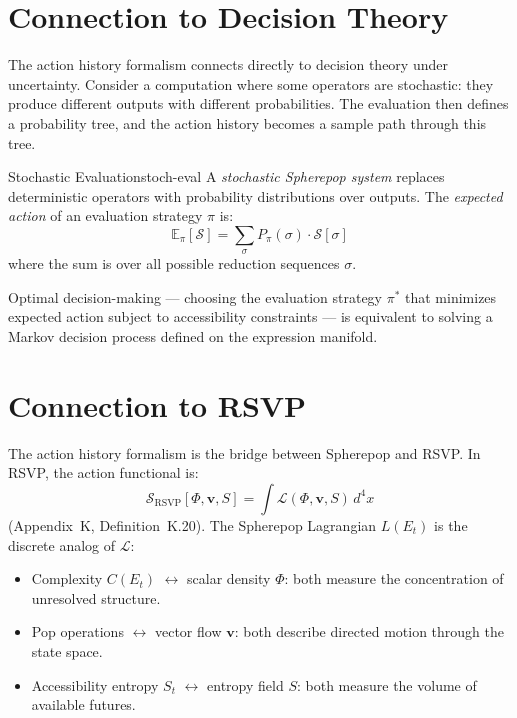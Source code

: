 \section{Connection to Decision Theory}

The action history formalism connects directly to decision theory under
uncertainty. Consider a computation where some operators are stochastic:
they produce different outputs with different probabilities. The evaluation
then defines a probability tree, and the action history becomes a sample
path through this tree.

\begin{definition}{Stochastic Evaluation}{stoch-eval}
  A \emph{stochastic Spherepop system} replaces deterministic operators
  with probability distributions over outputs. The \emph{expected action}
  of an evaluation strategy $\pi$ is:
  \[
    \mathbb{E}_\pi[\mathcal{S}] = \sum_\sigma P_\pi(\sigma) \cdot \mathcal{S}[\sigma]
  \]
  where the sum is over all possible reduction sequences $\sigma$.
\end{definition}

Optimal decision-making — choosing the evaluation strategy $\pi^*$ that
minimizes expected action subject to accessibility constraints — is
equivalent to solving a Markov decision process defined on the expression
manifold.

\section{Connection to RSVP}

The action history formalism is the bridge between Spherepop and RSVP.
In RSVP, the action functional is:
\[
  \mathcal{S}_\text{RSVP}[\Phi,\mathbf{v},S] =
  \int \mathcal{L}(\Phi,\mathbf{v},S)\,d^4x
\]
(Appendix~K, Definition~K.20). The Spherepop Lagrangian $L(E_t)$ is
the discrete analog of $\mathcal{L}$:

\begin{itemize}
  \item Complexity $C(E_t)$ $\leftrightarrow$ scalar density $\Phi$:
        both measure the concentration of unresolved structure.
  \item Pop operations $\leftrightarrow$ vector flow $\mathbf{v}$:
        both describe directed motion through the state space.
  \item Accessibility entropy $S_t$ $\leftrightarrow$ entropy field $S$:
        both measure the volume of available futures.
\end{itemize}

